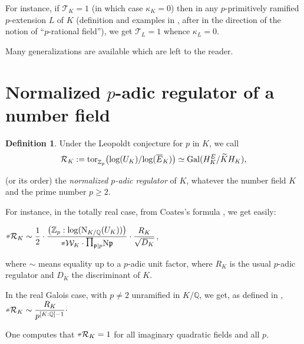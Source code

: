 \documentclass[12pt]{amsart}
\theoremstyle{definition}
\newtheorem{definition}[theorem]{Definition}
\numberwithin{equation}{section}
\let\ds=\displaystyle
\begin{document}
For instance, if ${\mathcal T}_K = 1$ (in which case $\kappa_K=0$)
then in any $p$-primitively ramified $p$-extension $L$ of $K$
(definition and examples in \cite[IV.3, (b); IV.3.5.1]{Gr1},
after \cite[Theorem 1, II.2 ]{Gr4} in the direction of the notion of 
``$p$-rational field''), we get ${\mathcal T}_L = 1$ whence $\kappa_L=0$.

\smallskip
Many generalizations are available which are left to the reader. 

\section{Normalized $p$-adic regulator of a number field}

\begin{definition} 
Under the Leopoldt conjecture for $p$ in $K$, we call 
$${\mathcal R}_K := {\rm tor}^{}_{{\mathbb{Z}}_p} \big ({\rm log} (U_K) / 
{\rm log} (\overline E_K)\big) \simeq  {\rm Gal}(H_K^E / \widetilde KH_K), $$ 

(or its order) the {\it normalized $p$-adic regulator} of $K$, whatever the 
number field $K$ and the prime number $p\geq 2$. 
\end{definition}

For instance, in the totally real case, from Coates's formula \cite[Appendix]{C}, 
we get easily:

\centerline{$\ds {\raise1.5pt \hbox{${\scriptscriptstyle \#}$}} {\mathcal R}_K \sim \frac{1}{2} \cdot
\frac{\big({\mathbb{Z}}_p : {\rm log}({\rm N}_{K/{\mathbb{Q}}}(U_K)) \big)}
{ {\raise1.5pt \hbox{${\scriptscriptstyle \#}$}} {\mathcal W}_K \cdot {\displaystyle\mathop{\raise 2.0pt \hbox{$\prod$}}\limits}_{{\mathfrak p} \mid p}{\rm N} {\mathfrak p}}
\cdot \frac {R_K}{\sqrt {D_K}}$,}

where $\sim$ means equality up to a $p$-adic unit factor, where $R_K$ 
is the usual $p$-adic regulator and $D_K$ the discriminant of $K$. 

\smallskip
In the real Galois case, with $p\ne 2$ unramified in $K/{\mathbb{Q}}$, 
we get, as defined in \cite[Definition 2.3]{Gr3},
$\ds {\raise1.5pt \hbox{${\scriptscriptstyle \#}$}} {\mathcal R}_K \sim \frac{R_K}{p^{[K : {\mathbb{Q}}]-1}}\cdot$

\smallskip
One computes that 
${\raise1.5pt \hbox{${\scriptscriptstyle \#}$}} {\mathcal R}_K=1$ for all imaginary quadratic fields and all $p$.
\end{document}
